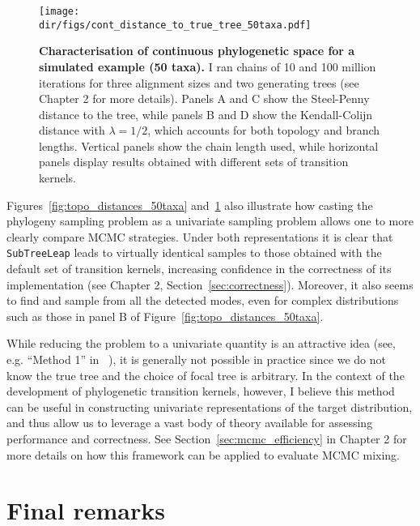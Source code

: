 \begin{figure}[!ht]
\begin{center}
\texttt{[image: \\dir/figs/cont\_distance\_to\_true\_tree\_50taxa.pdf]} 
\end{center}
 \caption[Characterisation of continuous phylogenetic space for a simulated example (50 taxa).]{\textbf{Characterisation of continuous phylogenetic space for a simulated example (50 taxa).}
  I ran chains of 10 and 100 million iterations for three alignment sizes and two generating trees (see Chapter 2 for more details).
 Panels A and C show the Steel-Penny~\citep{Steel1993} distance to the tree, while panels B and D show the Kendall-Colijn~\citep{Kendall2016} distance with $\lambda = 1/2$,  which accounts for both topology and branch lengths. 
 Vertical panels show the chain length used, while horizontal panels display results obtained with different sets of transition kernels.
 }
 \label{fig:cont_distances_50taxa}
\end{figure}
Figures~\ref{fig:topo_distances_50taxa} and~\ref{fig:cont_distances_50taxa} also illustrate how casting the phylogeny sampling problem as a univariate sampling problem allows one to more clearly compare MCMC strategies.
Under both representations it is clear that \verb|SubTreeLeap| leads to virtually identical samples to those obtained with the default set of transition kernels, increasing confidence in the correctness of its implementation (see Chapter 2, Section~\ref{sec:correctness}). 
Moreover, it also seems to find and sample from all the detected modes, even for complex distributions such as those in panel B of Figure~\ref{fig:topo_distances_50taxa}.

While reducing the problem to a univariate quantity is an attractive idea (see, e.g. ``Method 1'' in ~\cite{Lanfear2016}), it is generally not possible in practice since we do not know the true tree and the choice of focal tree is arbitrary.
In the context of the development of phylogenetic transition kernels, however, I believe this method can be useful in constructing univariate representations of the target distribution, and thus allow us to leverage a vast body of theory available for assessing performance and correctness.
See Section~\ref{sec:mcmc_efficiency} in Chapter 2 for more details on how this  framework can be applied to evaluate MCMC mixing.

\section{Final remarks}
\label{sec:conclusion}

